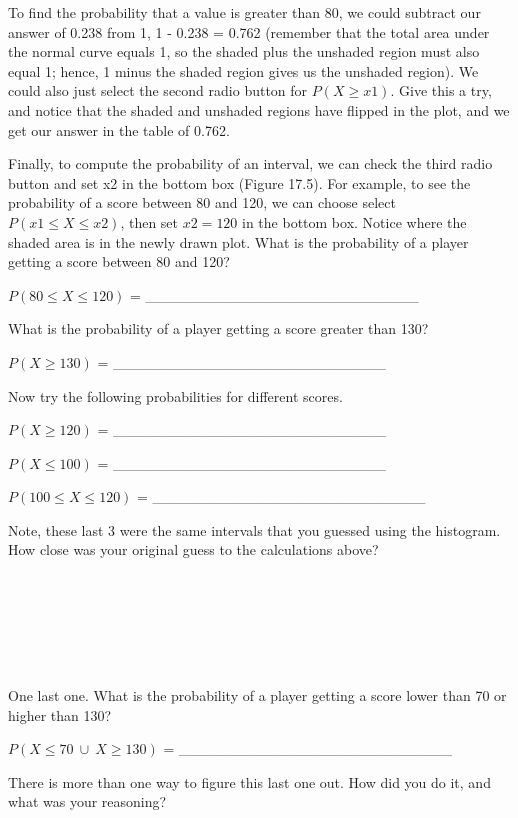 \documentclass[
  openany]{krantz}
\begin{document}
To find the probability that a value is greater than 80, we could subtract our answer of 0.238 from 1, 1 - 0.238 = 0.762 (remember that the total area under the normal curve equals 1, so the shaded plus the unshaded region must also equal 1; hence, 1 minus the shaded region gives us the unshaded region).
We could also just select the second radio button for \(P(X \geq x1)\).
Give this a try, and notice that the shaded and unshaded regions have flipped in the plot, and we get our answer in the table of 0.762.

Finally, to compute the probability of an interval, we can check the third radio button and set x2 in the bottom box (Figure 17.5).
For example, to see the probability of a score between 80 and 120, we can choose select \(P(x1 \leq X \leq x2)\), then set \(x2 = 120\) in the bottom box.
Notice where the shaded area is in the newly drawn plot.
What is the probability of a player getting a score between 80 and 120?

\(P(80 \leq X \leq 120)\) = \_\_\_\_\_\_\_\_\_\_\_\_\_\_\_\_\_\_\_\_\_\_\_\_\_\_

What is the probability of a player getting a score greater than 130?

\(P(X \geq 130)\) = \_\_\_\_\_\_\_\_\_\_\_\_\_\_\_\_\_\_\_\_\_\_\_\_\_\_

Now try the following probabilities for different scores.

\(P(X \geq 120)\) = \_\_\_\_\_\_\_\_\_\_\_\_\_\_\_\_\_\_\_\_\_\_\_\_\_\_

\(P(X \leq 100)\) = \_\_\_\_\_\_\_\_\_\_\_\_\_\_\_\_\_\_\_\_\_\_\_\_\_\_

\(P(100 \leq X \leq 120)\) = \_\_\_\_\_\_\_\_\_\_\_\_\_\_\_\_\_\_\_\_\_\_\_\_\_\_

Note, these last 3 were the same intervals that you guessed using the histogram.
How close was your original guess to the calculations above?

\begin{verbatim}






\end{verbatim}

One last one.
What is the probability of a player getting a score lower than 70 or higher than 130?

\(P(X \leq 70 \: \cup \: X \geq 130)\) = \_\_\_\_\_\_\_\_\_\_\_\_\_\_\_\_\_\_\_\_\_\_\_\_\_\_

There is more than one way to figure this last one out.
How did you do it, and what was your reasoning?
\end{document}
